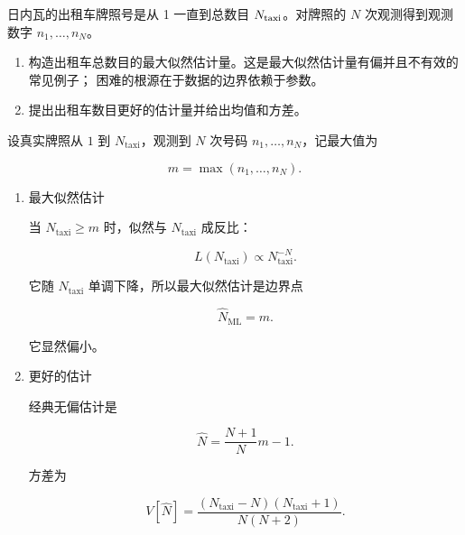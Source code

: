 \begin{question}
日内瓦的出租车牌照号是从 1 一直到总数目 \(N_{\rm taxi}\)。对牌照的 \(N\)
次观测得到观测数字 \(n_1,\ldots,n_N\)。

\begin{enumerate}
\item
  构造出租车总数目的最大似然估计量。这是最大似然估计量有偏并且不有效的常见例子；
  困难的根源在于数据的边界依赖于参数。
\item
  提出出租车数目更好的估计量并给出均值和方差。
\end{enumerate}
\begin{solution}
设真实牌照从 \(1\) 到 \(N_{\mathrm{taxi}}\)，观测到 \(N\) 次号码
\(n_1,\dots,n_N\)，记最大值为

\[
m=\max(n_1,\dots,n_N).
\]

\begin{enumerate}
\item 最大似然估计

当 \(N_{\mathrm{taxi}}\ge m\) 时，似然与 \(N_{\mathrm{taxi}}\) 成反比：

\[
L(N_{\mathrm{taxi}})\propto N_{\mathrm{taxi}}^{-N}.
\]

它随 \(N_{\mathrm{taxi}}\) 单调下降，所以最大似然估计是边界点

\[
\hat N_{\mathrm{ML}}=m.
\]

它显然偏小。

\item 更好的估计

经典无偏估计是

\[
\hat N=\frac{N+1}{N}m-1.
\]

方差为

\[
V[\hat N]=\frac{(N_{\mathrm{taxi}}-N)(N_{\mathrm{taxi}}+1)}{N(N+2)}.
\]
\end{enumerate}
\end{solution}
\end{question}


